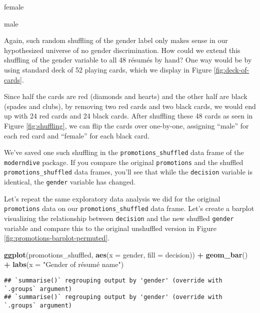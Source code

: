 \documentclass[
]{book}
\newenvironment{Shaded}{\begin{snugshade}}{\end{snugshade}}
\newcommand{\DataTypeTok}[1]{\textcolor[rgb]{0.13,0.29,0.53}{#1}}
\newcommand{\KeywordTok}[1]{\textcolor[rgb]{0.13,0.29,0.53}{\textbf{#1}}}
\newcommand{\NormalTok}[1]{#1}
\newcommand{\OperatorTok}[1]{\textcolor[rgb]{0.81,0.36,0.00}{\textbf{#1}}}
\newcommand{\StringTok}[1]{\textcolor[rgb]{0.31,0.60,0.02}{#1}}
\begin{document}
female

male

Again, such random shuffling of the gender label only makes sense in our hypothesized universe of no gender discrimination. How could we extend this shuffling of the gender variable to all 48 résumés by hand? One way would be by using standard deck of 52 playing cards, which we display in Figure \ref{fig:deck-of-cards}.

Since half the cards are red (diamonds and hearts) and the other half are black (spades and clubs), by removing two red cards and two black cards, we would end up with 24 red cards and 24 black cards. After shuffling these 48 cards as seen in Figure \ref{fig:shuffling}, we can flip the cards over one-by-one, assigning ``male'' for each red card and ``female'' for each black card.

We've saved one such shuffling in the \texttt{promotions\_shuffled} data frame of the \texttt{moderndive} package. If you compare the original \texttt{promotions} and the shuffled \texttt{promotions\_shuffled} data frames, you'll see that while the \texttt{decision} variable is identical, the \texttt{gender} variable has changed.

Let's repeat the same exploratory data analysis we did for the original \texttt{promotions} data on our \texttt{promotions\_shuffled} data frame. Let's create a barplot visualizing the relationship between \texttt{decision} and the new shuffled \texttt{gender} variable and compare this to the original unshuffled version in Figure \ref{fig:promotions-barplot-permuted}.

\begin{Shaded}
\begin{Highlighting}[]
\KeywordTok{ggplot}\NormalTok{(promotions_shuffled, }
       \KeywordTok{aes}\NormalTok{(}\DataTypeTok{x =}\NormalTok{ gender, }\DataTypeTok{fill =}\NormalTok{ decision)) }\OperatorTok{+}
\StringTok{  }\KeywordTok{geom_bar}\NormalTok{() }\OperatorTok{+}\StringTok{ }
\StringTok{  }\KeywordTok{labs}\NormalTok{(}\DataTypeTok{x =} \StringTok{"Gender of résumé name"}\NormalTok{)}
\end{Highlighting}
\end{Shaded}

\begin{verbatim}
## `summarise()` regrouping output by 'gender' (override with `.groups` argument)
## `summarise()` regrouping output by 'gender' (override with `.groups` argument)
\end{verbatim}
\end{document}
